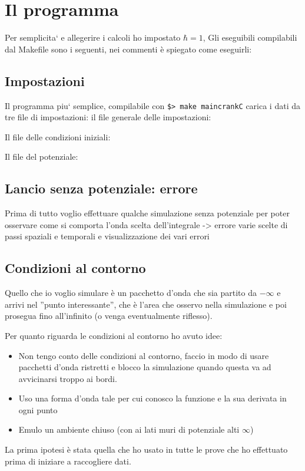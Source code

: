 \section{Il programma}
Per semplicita` e allegerire i calcoli ho impostato $\hbar=1$, 
Gli eseguibili compilabili dal Makefile sono i seguenti, nei commenti \`e spiegato come eseguirli:

\subsection{Impostazioni}
Il programma piu` semplice, compilabile con \lstinline|$> make maincrankC| carica i dati da tre file di impostazioni:
il file generale delle impostazioni:

Il file delle condizioni iniziali:

Il file del potenziale:

\subsection{Lancio senza potenziale: errore}
Prima di tutto voglio effettuare qualche simulazione senza potenziale per poter osservare come si comporta l'onda
scelta dell'integrale -> errore
varie scelte di passi spaziali e temporali e visualizzazione dei vari errori
\subsection{Condizioni al contorno}
Quello che io voglio simulare \`e un pacchetto d'onda che sia partito da $-\infty$ e arrivi nel ''punto interessante'', che \`e l'area che osservo nella simulazione e poi prosegua fino all'infinito (o venga eventualmente riflesso).

Per quanto riguarda le condizioni al contorno ho avuto idee:
\begin{itemize}
	\item Non tengo conto delle condizioni al contorno, faccio in modo di usare pacchetti d'onda ristretti e blocco la simulazione quando questa va ad  avvicinarsi troppo ai bordi.
	\item Uso una forma d'onda tale per cui conosco la funzione e la sua derivata in ogni punto
	\item Emulo un ambiente chiuso (con ai lati muri di potenziale alti $\infty$)
\end{itemize}
La prima ipotesi \`e stata quella che ho usato in tutte le prove che ho effettuato prima di iniziare a raccogliere dati.

